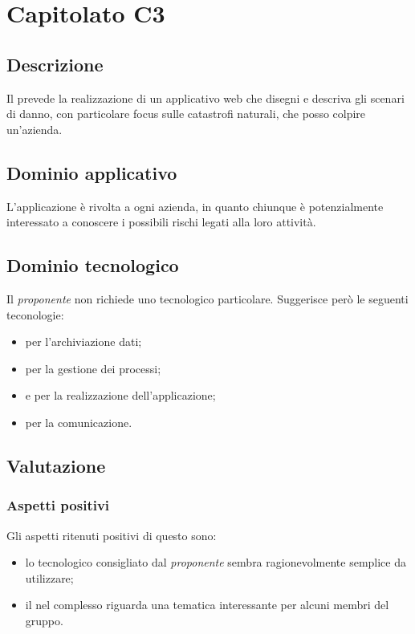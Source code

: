\documentclass[../StudioDiFattibilita.tex]{subfiles}
\begin{document}
	\section{Capitolato C3}
		\subsection{Descrizione}
			Il  prevede la realizzazione di un applicativo web che disegni e descriva gli scenari di danno, con particolare focus sulle catastrofi naturali, che posso colpire un'azienda.
		\subsection{Dominio applicativo}
			L'applicazione è rivolta a ogni azienda, in quanto chiunque è potenzialmente interessato a conoscere i possibili rischi legati alla loro attività.
		\subsection{Dominio tecnologico} %
			Il \textit{proponente} non richiede uno  tecnologico particolare. Suggerisce però le seguenti teconologie:
			\begin{itemize}
				\item \textbf{} per l'archiviazione dati;
				\item \textbf{} per la gestione dei processi;
				\item \textbf{} e \textbf{} per la realizzazione dell'applicazione;
				\item \textbf{} per la comunicazione.
			\end{itemize}
		\subsection{Valutazione}
			\subsubsection{Aspetti positivi}
				Gli aspetti ritenuti positivi di questo  sono:
				\begin{itemize}
					\item lo  tecnologico consigliato dal \textit{proponente} sembra ragionevolmente semplice da utilizzare;
					\item il  nel complesso riguarda una tematica interessante per alcuni membri del gruppo.
				\end{itemize}					
\end{document}
